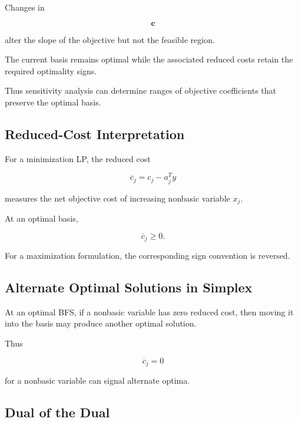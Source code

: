 Changes in

\[
\mathbf{c}
\]

alter the slope of the objective but not the feasible region.

The current basis remains optimal while the associated reduced costs
retain the required optimality signs.

Thus sensitivity analysis can determine ranges of objective coefficients
that preserve the optimal basis.

\subsection{Reduced-Cost Interpretation}
\label{subsec:lp-reduced-cost-interpretation}

For a minimization LP, the reduced cost

\[
\boxed{
\overline c_j
=
c_j-a_j^Ty
}
\]

measures the net objective cost of increasing nonbasic variable \(x_j\).

At an optimal basis,

\[
\boxed{
\overline c_j\geq0.
}
\]

For a maximization formulation, the corresponding sign convention is
reversed.

\subsection{Alternate Optimal Solutions in Simplex}
\label{subsec:simplex-alternate-optimum}

At an optimal BFS, if a nonbasic variable has zero reduced cost, then
moving it into the basis may produce another optimal solution.

Thus

\[
\boxed{
\overline c_j=0
}
\]

for a nonbasic variable can signal alternate optima.

\subsection{Dual of the Dual}
\label{subsec:dual-of-dual}

